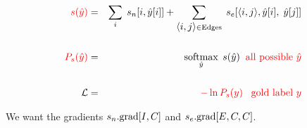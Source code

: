 {\vfill
\begin{eqnarray*}
{\color{red} s(\hat{y})} & = & \sum_i\;s_n[i,\hat{y}[i]] + \sum_{{\mbox{$\langle i,j\rangle$}} \in \mathrm{Edges}}\;s_e[{\mbox{$\langle i,j\rangle$}},\hat{y}[i],\;\hat{y}[j]] \\
\\
{\color{red} P_s(\hat{y})} & = & \operatorname*{softmax}_{\hat{y}}\;s(\hat{y}) \;\;\mbox{\color{red} all possible $\hat{y}$} \\
\\
{\cal L} & = & {\color{red} - \ln P_s(y) \;\;\;\mbox{gold label $y$}}
\end{eqnarray*}

\vfill
We want the gradients {\color{red} $s_n.\mathrm{grad}[I,C]$} and {\color{red} $s_e.\mathrm{grad}[E,C,C]$}.



}


